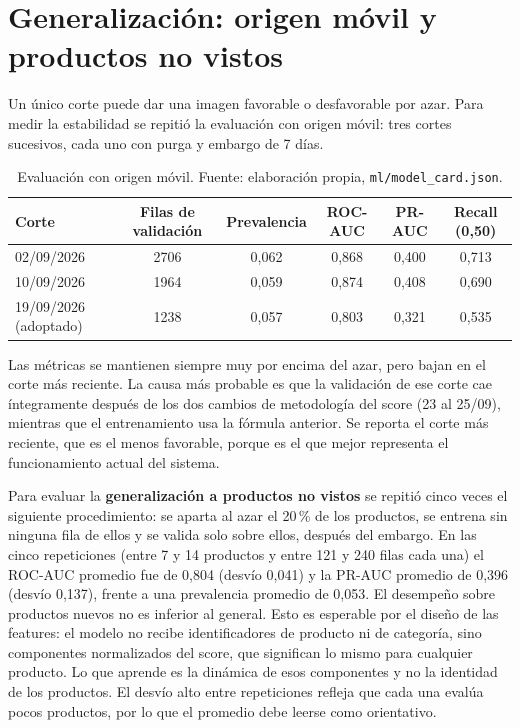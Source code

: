 \section{Generalización: origen móvil y productos no vistos}\label{sec:ml-generalizacion}

Un único corte puede dar una imagen favorable o desfavorable por azar. Para medir la estabilidad se repitió la evaluación con origen móvil: tres cortes sucesivos, cada uno con purga y embargo de 7 días.

\begin{table}[H]
	\centering
	\small
	\caption{Evaluación con origen móvil. Fuente: elaboración propia, \texttt{ml/model\_card.json}.}
	\label{tab:ml-origen-movil}
	\begin{tabular}{@{}lccccc@{}}
		\toprule
		\textbf{Corte} & \textbf{Filas de validación} & \textbf{Prevalencia} & \textbf{ROC-AUC} & \textbf{PR-AUC} & \textbf{Recall (0,50)} \\
		\midrule
		02/09/2026 & 2706 & 0,062 & 0,868 & 0,400 & 0,713 \\
		10/09/2026 & 1964 & 0,059 & 0,874 & 0,408 & 0,690 \\
		19/09/2026 (adoptado) & 1238 & 0,057 & 0,803 & 0,321 & 0,535 \\
		\bottomrule
	\end{tabular}
\end{table}

Las métricas se mantienen siempre muy por encima del azar, pero bajan en el corte más reciente. La causa más probable es que la validación de ese corte cae íntegramente después de los dos cambios de metodología del score (23 al 25/09), mientras que el entrenamiento usa la fórmula anterior. Se reporta el corte más reciente, que es el menos favorable, porque es el que mejor representa el funcionamiento actual del sistema.

Para evaluar la \textbf{generalización a productos no vistos} se repitió cinco veces el siguiente procedimiento: se aparta al azar el 20\,\% de los productos, se entrena sin ninguna fila de ellos y se valida solo sobre ellos, después del embargo. En las cinco repeticiones (entre 7 y 14 productos y entre 121 y 240 filas cada una) el ROC-AUC promedio fue de 0,804 (desvío 0,041) y la PR-AUC promedio de 0,396 (desvío 0,137), frente a una prevalencia promedio de 0,053. El desempeño sobre productos nuevos no es inferior al general. Esto es esperable por el diseño de las features: el modelo no recibe identificadores de producto ni de categoría, sino componentes normalizados del score, que significan lo mismo para cualquier producto. Lo que aprende es la dinámica de esos componentes y no la identidad de los productos. El desvío alto entre repeticiones refleja que cada una evalúa pocos productos, por lo que el promedio debe leerse como orientativo.

